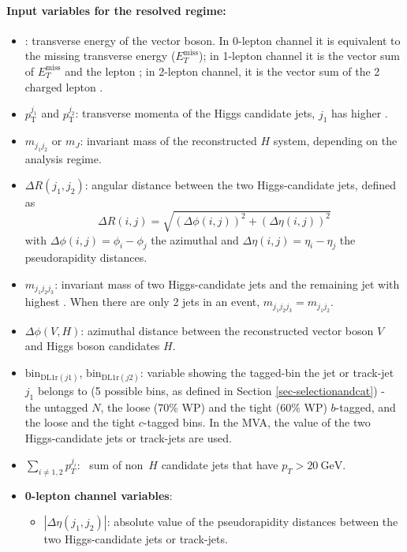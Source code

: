 \paragraph{Input variables for the resolved regime:}
\begin{itemize}
    \item \ptv: transverse energy of the vector boson. In 0-lepton channel it is equivalent to the missing transverse energy ($E_T^{\textrm{miss}}$); in 1-lepton channel it is the vector sum of $E_T^{\textrm{miss}}$ and the lepton \pt; in 2-lepton channel, it is the vector sum of the 2 charged lepton \pt.
    \item $p_{\text{T}}^{j_1}$ and $p_{\text{T}}^{j_2}$: transverse momenta of the Higgs candidate jets, $j_1$ has higher \pt.
    \item $m_{j_1j_2}$ or $m_J$: invariant mass of the reconstructed $H$ system, depending on the analysis regime.
    \item $\Delta R (j_1,j_2)$: angular distance between the two Higgs-candidate jets, defined as \[\Delta R(i,j) = \sqrt{(\Delta\phi(i,j))^2+ (\Delta\eta (i,j))^2}\] with $\Delta\phi(i,j) = \phi_i-\phi_j$ the azimuthal and $\Delta \eta(i,j)= \eta_i-\eta_j$ the pseudorapidity distances.
    \item $m_{j_1 j_2 j_3}$: invariant mass of two Higgs-candidate jets and the remaining jet with highest \pt. When there are only 2 jets in an event, $m_{j_1 j_2 j_3}=m_{j_1j_2}$.
    \item $\Delta \phi(\textbf{$V$},\textbf{$H$})$: azimuthal distance between the reconstructed vector boson $V$ and Higgs boson candidates $H$.
    \item $\mathrm{bin}_{\mathrm{DL1r}(j1)}$, $\mathrm{bin}_{\mathrm{DL1r}(j2)}$: variable showing the tagged-bin the jet or track-jet $j_1$ belongs to (5 possible bins, as defined in Section \ref{sec-selectionandcat}) - the untagged $N$, the loose (70\% WP) and the tight (60\% WP) $b$-tagged, and the loose and the tight $c$-tagged bins. In the MVA, the value of the two Higgs-candidate jets or track-jets are used.
    \item $\sum\limits_{i\neq 1, 2}p_T^{j_i}$: \pt~sum of non~$H$ candidate jets that have $p_T>20~\text{GeV}$.
    \item \textbf{0-lepton channel variables}: 
    \begin{itemize}
        \item $|\Delta \eta (j_1,j_2)|$: absolute value of the pseudorapidity distances between the two Higgs-candidate jets or track-jets.

\end{itemize}
\end{itemize}
